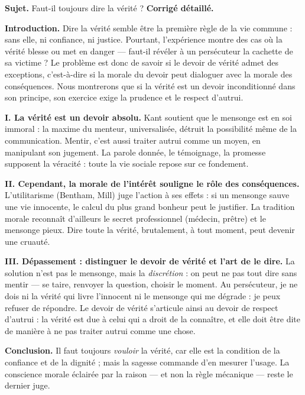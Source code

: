 \documentclass[11pt]{article}
\begin{document}
\begin{exoresolu}
\textbf{Sujet.} Faut-il toujours dire la vérité ?
\tcblower
\textbf{Corrigé détaillé.}

\textbf{Introduction.} Dire la vérité semble être la première règle de la vie commune : sans elle, ni confiance, ni justice. Pourtant, l'expérience montre des cas où la vérité blesse ou met en danger — faut-il révéler à un persécuteur la cachette de sa victime ? Le problème est donc de savoir si le devoir de vérité admet des exceptions, c'est-à-dire si la morale du devoir peut dialoguer avec la morale des conséquences. Nous montrerons que si la vérité est un devoir inconditionné dans son principe, son exercice exige la prudence et le respect d'autrui.

\textbf{I. La vérité est un devoir absolu.} Kant soutient que le mensonge est en soi immoral : la maxime du menteur, universalisée, détruit la possibilité même de la communication. Mentir, c'est aussi traiter autrui comme un moyen, en manipulant son jugement. La parole donnée, le témoignage, la promesse supposent la véracité : toute la vie sociale repose sur ce fondement.

\textbf{II. Cependant, la morale de l'intérêt souligne le rôle des conséquences.} L'utilitarisme (Bentham, Mill) juge l'action à ses effets : si un mensonge sauve une vie innocente, le calcul du plus grand bonheur peut le justifier. La tradition morale reconnaît d'ailleurs le secret professionnel (médecin, prêtre) et le mensonge pieux. Dire toute la vérité, brutalement, à tout moment, peut devenir une cruauté.

\textbf{III. Dépassement : distinguer le devoir de vérité et l'art de le dire.} La solution n'est pas le mensonge, mais la \emph{discrétion} : on peut ne pas tout dire sans mentir — se taire, renvoyer la question, choisir le moment. Au persécuteur, je ne dois ni la vérité qui livre l'innocent ni le mensonge qui me dégrade : je peux refuser de répondre. Le devoir de vérité s'articule ainsi au devoir de respect d'autrui : la vérité est due à celui qui a droit de la connaître, et elle doit être dite de manière à ne pas traiter autrui comme une chose.

\textbf{Conclusion.} Il faut toujours \emph{vouloir} la vérité, car elle est la condition de la confiance et de la dignité ; mais la sagesse commande d'en mesurer l'usage. La conscience morale éclairée par la raison — et non la règle mécanique — reste le dernier juge.
\end{exoresolu}
\end{document}
